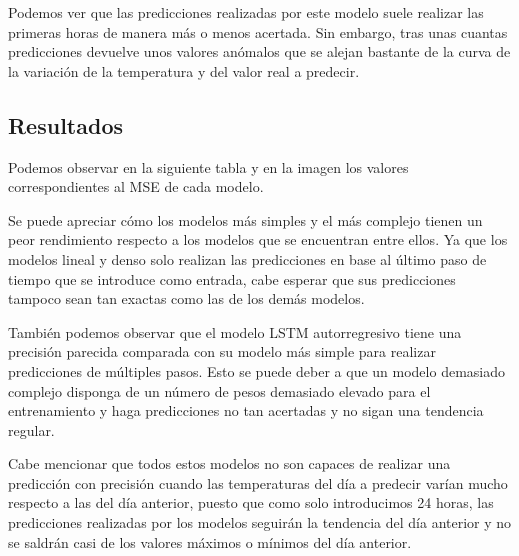 \par

Podemos ver que las predicciones realizadas por este modelo suele realizar las primeras horas de manera más o menos acertada. Sin embargo, tras unas cuantas predicciones devuelve unos valores anómalos que se alejan bastante de la curva de la variación de la temperatura y del valor real a predecir.


\subsection{Resultados}

Podemos observar en la siguiente tabla y en la imagen los valores correspondientes al MSE de cada modelo.



Se puede apreciar cómo los modelos más simples y el más complejo tienen un peor rendimiento respecto a los modelos que se encuentran entre ellos. Ya que los modelos lineal y denso solo realizan las predicciones en base al último paso de tiempo que se introduce como entrada, cabe esperar que sus predicciones tampoco sean tan exactas como las de los demás modelos.

\par

También podemos observar que el modelo LSTM autorregresivo tiene una precisión parecida comparada con su modelo más simple para realizar predicciones de múltiples pasos. Esto se puede deber a que un modelo demasiado complejo disponga de un número de pesos demasiado elevado para el entrenamiento y haga predicciones no tan acertadas y no sigan una tendencia regular.

\par

Cabe mencionar que todos estos modelos no son capaces de realizar una predicción con precisión cuando las temperaturas del día a predecir varían mucho respecto a las del día anterior, puesto que como solo introducimos 24 horas, las predicciones realizadas por los modelos seguirán la tendencia del día anterior y no se saldrán casi de los valores máximos o mínimos del día anterior.